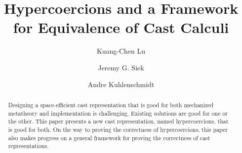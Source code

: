 \documentclass[acmsmall,review,anonymous]{acmart}\settopmatter{printfolios=true,printccs=false,printacmref=false}
\begin{document}
\title{Hypercoercions and a Framework for Equivalence of Cast Calculi}


\author{Kuang-Chen Lu}



\author{Jeremy G. Siek}


\author{Andre Kuhlenschmidt}


\begin{abstract}
  Designing a space-efficient cast representation that is good for
  both mechanized metatheory and implementation is
  challenging. Existing solutions are good for one or the other. This
  paper presents a new cast representation, named hypercoercions, that
  is good for both. On the way to proving the correctness of
  hypercoercions, this paper also makes progress on a general
  framework for proving the correctness of cast representations.
\end{abstract}
\end{document}
